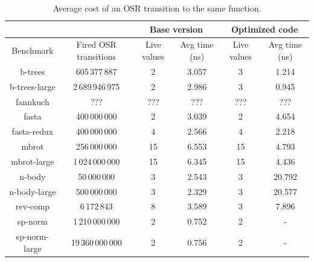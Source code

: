 \begin{table} 
\begin{footnotesize}
    \begin{tabular}{ |c|c|c|c|c|c| }
        \cline{3-6}
        \multicolumn{2}{c|}{} & \multicolumn{2}{c|}{Base version} & \multicolumn{2}{c|}{Optimized code} \\
        \hline
        Benchmark & Fired OSR transitions & Live values & Avg time (ns) & Live values & Avg time (ns) \\ 
        \hline
        \hline
        b-trees & 605\,377\,887 & 2 & 3.057 & 3 & 1.214 \\ 
        \hline
        b-trees-large & 2\,689\,946\,975 & 2 & 2.986 & 3 & 0.945 \\ 
        \hline
        fannkuch & ??? & ??? & ??? & ??? & ??? \\ 
        \hline
        fasta & 400\,000\,000 & 2 & 3.039 & 2 & 4.654 \\ 
        \hline
        fasta-redux & 400\,000\,000 & 4 & 2.566 & 4 & 2.218 \\ 
        \hline
        mbrot & 256\,000\,000 & 15 & 6.553 & 15 & 4.793 \\ 
        \hline
        mbrot-large & 1\,024\,000\,000 & 15 & 6.345 & 15 & 4.436 \\ 
        \hline
        n-body & 50\,000\,000 & 3 & 2.543 & 3 & 20.792 \\ 
        \hline
        n-body-large & 500\,000\,000 & 3 & 2.329 & 3 & 20.577 \\ 
        \hline
        rev-comp & 6\,172\,843 & 8 & 3.589 & 3 & 7.896 \\ 
        \hline
        sp-norm & 1\,210\,000\,000 & 2 & 0.752 & 2 & - \\ 
        \hline 
        sp-norm-large & 19\,360\,000\,000 & 2 & 0.756 & 2 &- \\
        \hline
    \end{tabular} 
\end{footnotesize}
\caption{\label{tab:sameFun}Average cost of an OSR transition to the same function.} 
\end{table}

